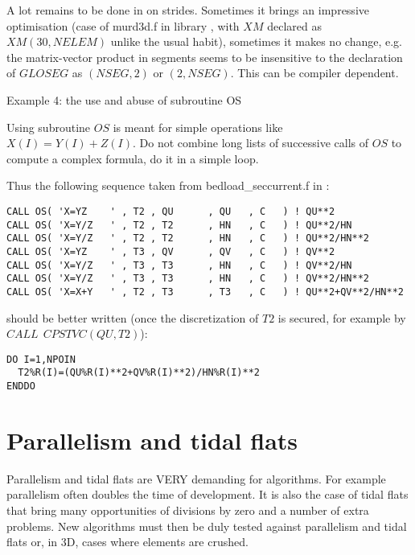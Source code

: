 A lot remains to be done in \telemacsystem on strides. Sometimes it brings an
impressive optimisation (case of murd3d.f in library , with $XM$
declared as $XM(30,NELEM)$ unlike the usual habit), sometimes it makes no change,
e.g. the matrix-vector product in segments seems to be insensitive to the
declaration of $GLOSEG$ as $(NSEG,2)$ or $(2,NSEG)$. This can be compiler dependent.

Example 4: the use and abuse of subroutine OS

Using subroutine $OS$ is meant for simple operations like $X(I)=Y(I)+Z(I)$. Do
not combine long lists of successive calls of $OS$ to compute a complex formula,
do it in a simple loop.

Thus the following sequence taken from bedload\_seccurrent.f in \sisyphe:
\begin{lstlisting}
CALL OS( 'X=YZ    ' , T2 , QU      , QU   , C   ) ! QU**2
CALL OS( 'X=Y/Z   ' , T2 , T2      , HN   , C   ) ! QU**2/HN
CALL OS( 'X=Y/Z   ' , T2 , T2      , HN   , C   ) ! QU**2/HN**2
CALL OS( 'X=YZ    ' , T3 , QV      , QV   , C   ) ! QV**2
CALL OS( 'X=Y/Z   ' , T3 , T3      , HN   , C   ) ! QV**2/HN
CALL OS( 'X=Y/Z   ' , T3 , T3      , HN   , C   ) ! QV**2/HN**2
CALL OS( 'X=X+Y   ' , T2 , T3      , T3   , C   ) ! QU**2+QV**2/HN**2
\end{lstlisting}
should be better written (once the discretization of $T2$ is secured, for example
by $CALL~~CPSTVC(QU, T2)$):
\begin{lstlisting}
DO I=1,NPOIN
  T2%R(I)=(QU%R(I)**2+QV%R(I)**2)/HN%R(I)**2
ENDDO
\end{lstlisting}

\section{Parallelism and tidal flats}

Parallelism and tidal flats are VERY demanding for algorithms. For example
parallelism often doubles the time of development. It is also the case of tidal
flats that bring many opportunities of divisions by zero and a number of extra
problems. New algorithms must then be duly tested against parallelism and tidal
flats or, in 3D, cases where elements are crushed.
%
